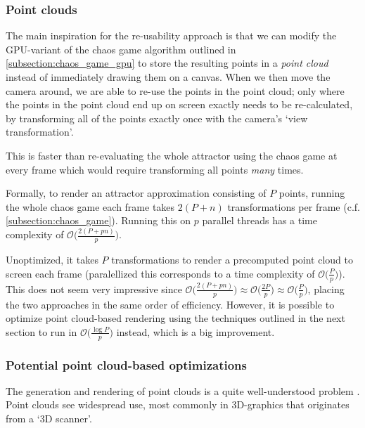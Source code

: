 \documentclass[11pt]{article}
\begin{document}
\subsubsection{Point clouds}
\label{sec:orga07332c}

The main inspiration for the re-usability approach is that we can modify the GPU-variant of the chaos game algorithm outlined in \autoref{subsection:chaos_game_gpu}
to store the resulting points in a \emph{point cloud} instead of immediately drawing them on a canvas.
When we then move the camera around, we are able to re-use the points in the point cloud;
only where the points in the point cloud end up on screen exactly needs to be re-calculated, 
by transforming all of the points exactly once with the camera's `view transformation'.

This is faster than re-evaluating the whole attractor using the chaos game at every frame which would require transforming all points \emph{many} times.

Formally, to render an attractor approximation consisting of \(P\) points, 
running the whole chaos game each frame takes \(2(P+n)\) transformations per frame (c.f. \autoref{subsection:chaos_game}). 
Running this on \(p\) parallel threads has a time complexity of \(\mathcal{O}\big(\frac{2(P+pn)}{p}\big)\).

Unoptimized, it takes \(P\) transformations to render a precomputed point cloud to screen each frame 
(paralellized this corresponds to a time complexity of \(\mathcal{O}\big(\frac{P}{p}\big)\)).
This does not seem very impressive since \(\mathcal{O}\big(\frac{2(P+pn)}{p}\big) \approx \mathcal{O}\big(\frac{2P}{p}\big) \approx \mathcal{O}\big(\frac{P}{p}\big)\),
placing the two approaches in the same order of efficiency. However, it is possible to optimize point cloud-based rendering using the techniques outlined in the next section
to run in \(\mathcal{O}\big(\frac{\log{P}}{p}\big)\) instead, which is a big improvement.

\subsubsection{Potential point cloud-based optimizations}
\label{sec:org35380bf}
\label{subsection:point_cloud_optimizations}

The generation and rendering of point clouds is a quite well-understood problem \cite{wimmer2006instant}. 
Point clouds see widespread use,
most commonly in 3D-graphics that originates from a `3D scanner'.
\end{document}
